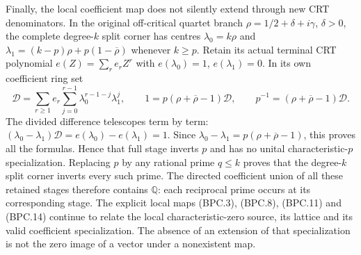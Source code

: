 Finally, the local coefficient map does not
silently extend through new CRT denominators.
In the original off-critical quartet branch
\(\rho=1/2+\delta+i\gamma\), \(\delta>0\),
the complete degree-\(k\) split corner has
centres \(\lambda_0=k\rho\) and
\(\lambda_1=(k-p)\rho+p(1-\overline\rho)\)
whenever \(k\geq p\).  Retain its actual
terminal CRT polynomial \(e(Z)=\sum_r e_rZ^r\)
with \(e(\lambda_0)=1\), \(e(\lambda_1)=0\).
In its own coefficient ring set
\[
 \mathscr D=\sum_{r\geq1}e_r
       \sum_{j=0}^{r-1}\lambda_0^{r-1-j}\lambda_1^j,
 \qquad
 1=p(\rho+\overline\rho-1)\mathscr D,
 \qquad p^{-1}=(\rho+\overline\rho-1)\mathscr D.
\tag{BTF.9}\label{eq:btf9}
\]
The divided difference telescopes term by term:
\((\lambda_0-\lambda_1)\mathscr D
=e(\lambda_0)-e(\lambda_1)=1\).
Since \(\lambda_0-\lambda_1
=p(\rho+\overline\rho-1)\), this proves all
the formulas.  Hence that full stage inverts
\(p\) and has no unital characteristic-\(p\)
specialization.  Replacing \(p\) by any
rational prime \(q\leq k\) proves that the
degree-\(k\) split corner inverts every such
prime.  The directed coefficient union of
all these retained stages therefore contains
\(\mathbb Q\): each reciprocal prime occurs
at its corresponding stage.  The explicit
local maps (BPC.3), (BPC.8), (BPC.11) and
(BPC.14) continue to relate the local
characteristic-zero source, its lattice and
its valid coefficient specialization.  The
absence of an extension of that specialization
is not the zero image of a vector under a
nonexistent map.

